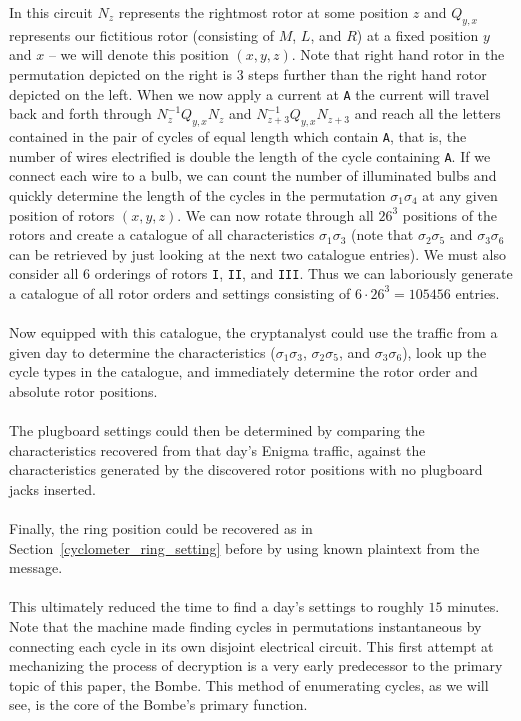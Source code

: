In this circuit $N_z$ represents the rightmost rotor at some position
$z$ and $Q_{y,x}$ represents our fictitious rotor (consisting of $M$,
$L$, and $R$) at a fixed position $y$ and $x$ -- we will denote this
position $(x,y,z)$. Note that right hand
rotor in the permutation depicted on the right is 3 steps further
than the right hand rotor depicted on the left. When we now apply a
current at \texttt{A} the current will travel back and forth through
$N^{-1}_zQ_{y,x}N_z$ and $N^{-1}_{z+3}Q_{y,x}N_{z+3}$ and reach all
the letters contained
in the pair of cycles of equal length which contain \texttt{A}, that
is, the number of wires electrified is double the length of the cycle
containing \texttt{A}. If we connect each wire to a bulb, we can
count the number of illuminated bulbs and quickly determine the length of
the cycles in the permutation $\sigma_1\sigma_{4}$ at any given
position of rotors $(x,y,z)$. We can now rotate through all
$26^3$ positions of the rotors and create a catalogue of all
characteristics $\sigma_1\sigma_3$ (note that $\sigma_2\sigma_5$ and
  $\sigma_3\sigma_6$ can be retrieved by just looking at the next two
catalogue entries). We must also consider all 6 orderings of rotors
\texttt{I}, \texttt{II}, and \texttt{III}. Thus we can laboriously
generate a catalogue of all rotor orders and settings consisting of
$6\cdot 26^3 = 105456$ entries.
\\\\Now equipped with this catalogue, the cryptanalyst could use the
traffic from a given day to determine the characteristics
($\sigma_1\sigma_3$, $\sigma_2\sigma_5$, and $\sigma_3\sigma_6$), look up
the cycle types in the catalogue, and immediately determine the rotor order and
absolute rotor positions.
\\\\The plugboard settings could then be
determined by comparing the characteristics recovered from that day's Enigma
traffic, against the characteristics generated by the discovered rotor
positions with no plugboard jacks inserted.
\\\\Finally, the ring position
could be recovered as in Section~\ref{cyclometer_ring_setting} before
by using known plaintext from
the message.
\\\\This ultimately reduced the time to find a day's
settings to roughly $15$ minutes. Note that the machine made finding
cycles in permutations
instantaneous by connecting each cycle in its own disjoint electrical
circuit. This first attempt at mechanizing the process of decryption
is a very early predecessor to the primary topic of this paper, the
Bombe. This method of enumerating cycles, as we will see, is the core
of the Bombe's primary function.

